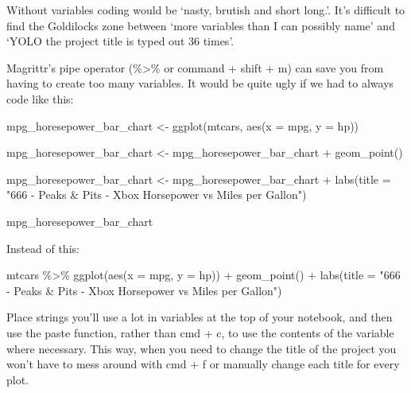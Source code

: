 \documentclass[
  letterpaper,
  DIV=11,
  numbers=noendperiod]{scrreprt}
\newenvironment{Shaded}{\begin{snugshade}}{\end{snugshade}}
\newcommand{\AttributeTok}[1]{\textcolor[rgb]{0.40,0.45,0.13}{#1}}
\newcommand{\FunctionTok}[1]{\textcolor[rgb]{0.28,0.35,0.67}{#1}}
\newcommand{\NormalTok}[1]{\textcolor[rgb]{0.00,0.23,0.31}{#1}}
\newcommand{\OtherTok}[1]{\textcolor[rgb]{0.00,0.23,0.31}{#1}}
\newcommand{\SpecialCharTok}[1]{\textcolor[rgb]{0.37,0.37,0.37}{#1}}
\newcommand{\StringTok}[1]{\textcolor[rgb]{0.13,0.47,0.30}{#1}}
\begin{document}
Without variables coding would be `nasty, brutish and short long.'. It's
difficult to find the Goldilocks zone between `more variables than I can
possibly name' and `YOLO the project title is typed out 36 times'.

Magrittr's pipe operator (\%\textgreater\% or command + shift + m) can
save you from having to create too many variables. It would be quite
ugly if we had to always code like this:

\begin{Shaded}
\begin{Highlighting}[]
\NormalTok{mpg\_horesepower\_bar\_chart }\OtherTok{\textless{}{-}} \FunctionTok{ggplot}\NormalTok{(mtcars, }\FunctionTok{aes}\NormalTok{(}\AttributeTok{x =}\NormalTok{ mpg, }\AttributeTok{y =}\NormalTok{ hp))}

\NormalTok{mpg\_horesepower\_bar\_chart  }\OtherTok{\textless{}{-}}\NormalTok{ mpg\_horesepower\_bar\_chart  }\SpecialCharTok{+} \FunctionTok{geom\_point}\NormalTok{()}

\NormalTok{mpg\_horesepower\_bar\_chart  }\OtherTok{\textless{}{-}}\NormalTok{ mpg\_horesepower\_bar\_chart  }\SpecialCharTok{+} \FunctionTok{labs}\NormalTok{(}\AttributeTok{title =} \StringTok{"666 {-} Peaks \& Pits {-} Xbox Horsepower vs Miles per Gallon"}\NormalTok{)}

\NormalTok{mpg\_horesepower\_bar\_chart}
\end{Highlighting}
\end{Shaded}

Instead of this:

\begin{Shaded}
\begin{Highlighting}[]
\NormalTok{mtcars }\SpecialCharTok{\%\textgreater{}\%}
  \FunctionTok{ggplot}\NormalTok{(}\FunctionTok{aes}\NormalTok{(}\AttributeTok{x =}\NormalTok{ mpg, }\AttributeTok{y =}\NormalTok{ hp)) }\SpecialCharTok{+}
  \FunctionTok{geom\_point}\NormalTok{() }\SpecialCharTok{+}
  \FunctionTok{labs}\NormalTok{(}\AttributeTok{title =} \StringTok{"666 {-} Peaks \& Pits {-} Xbox Horsepower vs Miles per Gallon"}\NormalTok{)}
\end{Highlighting}
\end{Shaded}

Place strings you'll use a lot in variables at the top of your notebook,
and then use the paste function, rather than cmd + c, to use the
contents of the variable where necessary. This way, when you need to
change the title of the project you won't have to mess around with cmd +
f or manually change each title for every plot.
\end{document}
